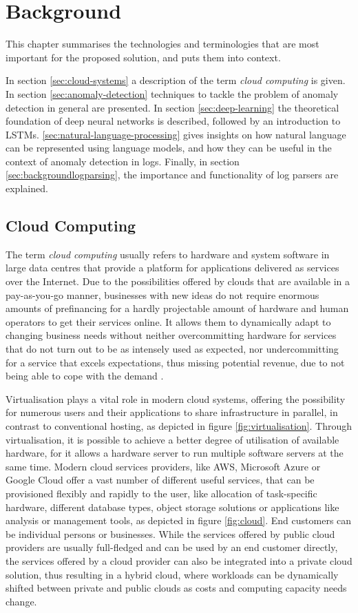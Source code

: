 \chapter{Background\label{cha:background}}
This chapter summarises the technologies and terminologies that are most important for the proposed solution, and puts them into context.

In section \ref{sec:cloud-systems} a description of the term \textit{cloud computing} is given. In section \ref{sec:anomaly-detection} techniques to tackle the problem of anomaly detection in general are presented. In section \ref{sec:deep-learning} the theoretical foundation of deep neural networks is described, followed by an introduction to LSTMs. \ref{sec:natural-language-processing} gives insights on how natural language can be represented using language models, and how they can be useful in the context of anomaly detection in logs. Finally, in section \ref{sec:backgroundlogparsing}, the importance and functionality of log parsers are explained.

\section{Cloud Computing\label{sec:cloud-systems}}
The term \textit{cloud computing} usually refers to hardware and system software in large data centres that provide a platform for applications delivered as services over the Internet. Due to the possibilities offered by clouds that are available in a pay-as-you-go manner, businesses with new ideas do not require enormous amounts of prefinancing for a hardly projectable amount of hardware and human operators to get their services online. It allows them to dynamically adapt to changing business needs without neither overcommitting hardware for services that do not turn out to be as intensely used as expected, nor undercommitting for a service that excels expectations, thus missing potential revenue, due to not being able to cope with the demand \cite{armbrust2010view}.

Virtualisation plays a vital role in modern cloud systems, offering the possibility for numerous users and their applications to share infrastructure in parallel, in contrast to conventional hosting, as depicted in figure \ref{fig:virtualisation}. Through virtualisation, it is possible to achieve a better degree of utilisation of available hardware, for it allows a hardware server to run multiple software servers at the same time. Modern cloud services providers, like AWS, Microsoft Azure or Google Cloud offer a vast number of different useful services, that can be provisioned flexibly and rapidly to the user, like allocation of task-specific hardware, different database types, object storage solutions or applications like analysis or management tools, as depicted in figure \ref{fig:cloud}. End customers can be individual persons or businesses. While the services offered by public cloud providers are usually full-fledged and can be used by an end customer directly, the services offered by a cloud provider can also be integrated into a private cloud solution, thus resulting in a hybrid cloud, where workloads can be dynamically shifted between private and public clouds as costs and computing capacity needs change.



